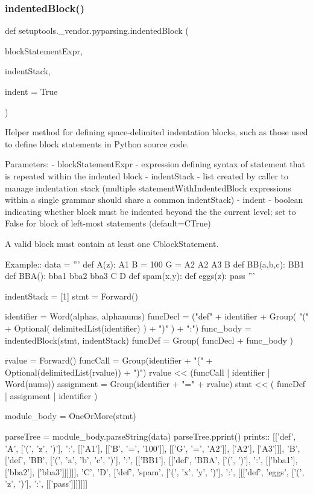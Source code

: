 \subsubsection{\texorpdfstring{indented\+Block()}{indentedBlock()}}
{\footnotesize\ttfamily def setuptools.\+\_\+vendor.\+pyparsing.\+indented\+Block (\begin{DoxyParamCaption}\item[{}]{block\+Statement\+Expr,  }\item[{}]{indent\+Stack,  }\item[{}]{indent = {\ttfamily True} }\end{DoxyParamCaption})}

\begin{DoxyVerb}Helper method for defining space-delimited indentation blocks, such as
those used to define block statements in Python source code.

Parameters:
 - blockStatementExpr - expression defining syntax of statement that
        is repeated within the indented block
 - indentStack - list created by caller to manage indentation stack
        (multiple statementWithIndentedBlock expressions within a single grammar
        should share a common indentStack)
 - indent - boolean indicating whether block must be indented beyond the
        the current level; set to False for block of left-most statements
        (default=C{True})

A valid block must contain at least one C{blockStatement}.

Example::
    data = '''
    def A(z):
      A1
      B = 100
      G = A2
      A2
      A3
    B
    def BB(a,b,c):
      BB1
      def BBA():
        bba1
        bba2
        bba3
    C
    D
    def spam(x,y):
         def eggs(z):
             pass
    '''


    indentStack = [1]
    stmt = Forward()

    identifier = Word(alphas, alphanums)
    funcDecl = ("def" + identifier + Group( "(" + Optional( delimitedList(identifier) ) + ")" ) + ":")
    func_body = indentedBlock(stmt, indentStack)
    funcDef = Group( funcDecl + func_body )

    rvalue = Forward()
    funcCall = Group(identifier + "(" + Optional(delimitedList(rvalue)) + ")")
    rvalue << (funcCall | identifier | Word(nums))
    assignment = Group(identifier + "=" + rvalue)
    stmt << ( funcDef | assignment | identifier )

    module_body = OneOrMore(stmt)

    parseTree = module_body.parseString(data)
    parseTree.pprint()
prints::
    [['def',
      'A',
      ['(', 'z', ')'],
      ':',
      [['A1'], [['B', '=', '100']], [['G', '=', 'A2']], ['A2'], ['A3']]],
     'B',
     ['def',
      'BB',
      ['(', 'a', 'b', 'c', ')'],
      ':',
      [['BB1'], [['def', 'BBA', ['(', ')'], ':', [['bba1'], ['bba2'], ['bba3']]]]]],
     'C',
     'D',
     ['def',
      'spam',
      ['(', 'x', 'y', ')'],
      ':',
      [[['def', 'eggs', ['(', 'z', ')'], ':', [['pass']]]]]]] 
\end{DoxyVerb}
